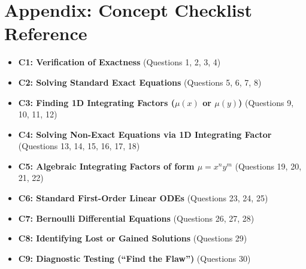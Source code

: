 \documentclass[11pt]{article}
\begin{document}
\newpage
\section*{Appendix: Concept Checklist Reference}
\begin{itemize}
    \item \textbf{C1: Verification of Exactness} (Questions 1, 2, 3, 4)
    \item \textbf{C2: Solving Standard Exact Equations} (Questions 5, 6, 7, 8)
    \item \textbf{C3: Finding 1D Integrating Factors ($\mu(x)$ or $\mu(y)$)} (Questions 9, 10, 11, 12)
    \item \textbf{C4: Solving Non-Exact Equations via 1D Integrating Factor} (Questions 13, 14, 15, 16, 17, 18)
    \item \textbf{C5: Algebraic Integrating Factors of form $\mu = x^n y^m$} (Questions 19, 20, 21, 22)
    \item \textbf{C6: Standard First-Order Linear ODEs} (Questions 23, 24, 25)
    \item \textbf{C7: Bernoulli Differential Equations} (Questions 26, 27, 28)
    \item \textbf{C8: Identifying Lost or Gained Solutions} (Questions 29)
    \item \textbf{C9: Diagnostic Testing (``Find the Flaw'')} (Questions 30)
\end{itemize}
\end{document}

